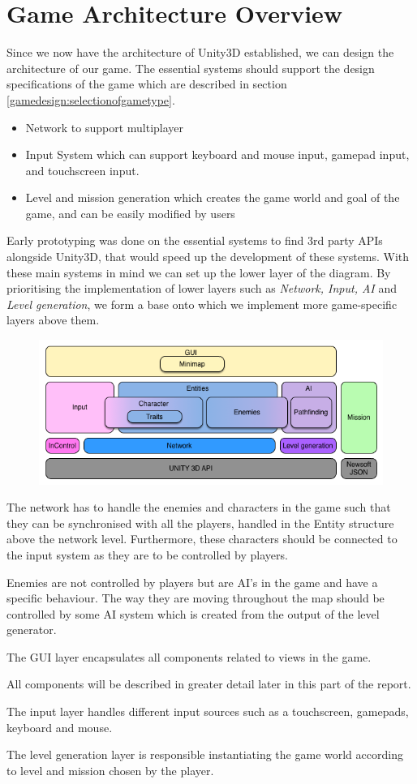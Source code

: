 \section{Game Architecture Overview}
Since we now have the architecture of Unity3D established, we can design the architecture of our game.
The essential systems should support the design specifications of the game which are described in section \ref{gamedesign:selectionofgametype}.
\begin{itemize}
    \item Network to support multiplayer
    \item Input System which can support keyboard and mouse input, gamepad input, and touchscreen input.
    \item Level and mission generation which creates the game world and goal of the game, and can be easily modified by users
\end{itemize}
Early prototyping was done on the essential systems to find 3rd party APIs alongside Unity3D, that would speed up the development of these systems.
With these main systems in mind we can set up the lower layer of the diagram.
By prioritising the implementation of lower layers such as \textit{Network, Input, AI} and \textit{Level generation}, we form a base onto which we implement more game-specific layers above them.

\begin{figure}
\includegraphics[width = \textwidth]{figures/architecture/game_architecture_overview.png}
\end{figure}

The network has to handle the enemies and characters in the game such that they can be synchronised with all the players, handled in the Entity structure above the network level.
Furthermore, these characters should be connected to the input system as they are to be controlled by players.

Enemies are not controlled by players but are AI's in the game and have a specific behaviour.
The way they are moving throughout the map should be controlled by some AI system which is created from the output of the level generator.

The GUI layer encapsulates all components related to views in the game.

All components will be described in greater detail later in this part of the report.

The input layer handles different input sources such as a touchscreen, gamepads, keyboard and mouse.

The level generation layer is responsible instantiating the game world according to level and mission chosen by the player.
